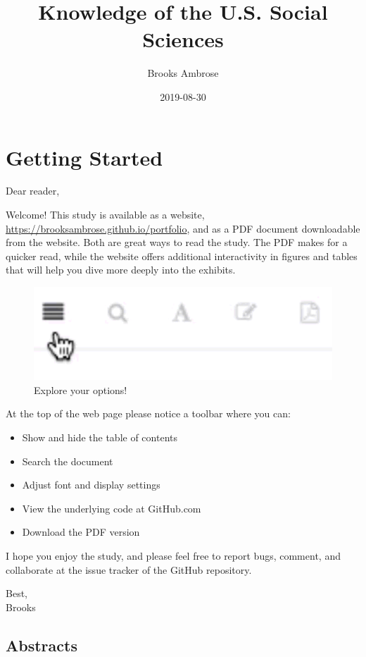 \documentclass[]{book}
\title{Knowledge of the U.S. Social Sciences}
\author{Brooks Ambrose}
\date{2019-08-30}
\providecommand{\tightlist}{%
  \setlength{\itemsep}{0pt}\setlength{\parskip}{0pt}}
\theoremstyle{definition}
\theoremstyle{definition}
\theoremstyle{definition}
\theoremstyle{remark}
\begin{document}
\maketitle

{
\setcounter{tocdepth}{2}
\tableofcontents
}
\listoftables
\listoffigures
\hypertarget{getting-started}{%
\chapter*{Getting Started}\label{getting-started}}


Dear reader,

Welcome! This study is available as a website,
\url{https://brooksambrose.github.io/portfolio}, and as a PDF document
downloadable from the website. Both are great ways to read the study.
The PDF makes for a quicker read, while the website offers additional
interactivity in figures and tables that will help you dive more deeply
into the exhibits.

\begin{figure}

{\centering \includegraphics[width=0.3\linewidth]{img/toolbar} 

}

\caption{Explore your options!}\label{fig:toolbar}
\end{figure}

At the top of the web page please notice a toolbar where you can:

\begin{itemize}
\tightlist
\item
  Show and hide the table of contents
\item
  Search the document
\item
  Adjust font and display settings
\item
  View the underlying code at GitHub.com
\item
  Download the PDF version
\end{itemize}

I hope you enjoy the study, and please feel free to report bugs,
comment, and collaborate at the issue tracker of the GitHub repository.

Best,\\
Brooks

\hypertarget{abstracts}{%
\section{Abstracts}\label{abstracts}}
\end{document}
